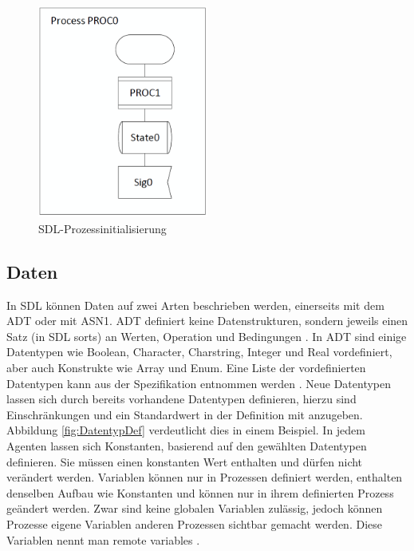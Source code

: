 \begin{figure}[h]
	\centering
	\includegraphics[width=0.5\textwidth]{Graphics/ProcessInit.png}
	\caption{SDL-Prozessinitialisierung}
	\label{fig:ProcessInit}
\end{figure}


\pagebreak
\subsection{Daten}
\label{ssc:Daten}
In \ac{SDL} können Daten auf zwei Arten beschrieben werden, einerseits mit dem \acs{ADT} oder mit \ac{ASN1}. \ac{ADT} definiert keine Datenstrukturen, sondern jeweils einen Satz (in \ac{SDL} sorts) an Werten, Operation und Bedingungen \cite[67]{ITUT104_2016}. In \ac{ADT} sind einige Datentypen wie Boolean, Character, Charstring, Integer und Real vordefiniert, aber auch Konstrukte wie Array und Enum. Eine Liste der vordefinierten Datentypen kann aus der Spezifikation entnommen werden \cite[47\psqq]{ITUT104_2016}. Neue Datentypen lassen sich durch bereits vorhandene Datentypen definieren, hierzu sind Einschränkungen und ein Standardwert in der Definition mit anzugeben. Abbildung \ref{fig:DatentypDef} verdeutlicht dies in einem Beispiel. In jedem Agenten lassen sich Konstanten, basierend auf den gewählten Datentypen definieren. Sie müssen einen konstanten Wert enthalten und dürfen nicht verändert werden. Variablen können nur in Prozessen definiert werden, enthalten denselben Aufbau wie Konstanten und können nur in ihrem definierten Prozess geändert werden. Zwar sind keine globalen Variablen zulässig, jedoch können Prozesse eigene Variablen anderen Prozessen sichtbar gemacht werden. Diese Variablen nennt man remote variables \cite[31]{ITUT102_2016}.

